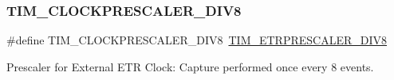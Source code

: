 \subsubsection{\texorpdfstring{TIM\_CLOCKPRESCALER\_DIV8}{TIM\_CLOCKPRESCALER\_DIV8}}
{\footnotesize\ttfamily \#define T\+I\+M\+\_\+\+C\+L\+O\+C\+K\+P\+R\+E\+S\+C\+A\+L\+E\+R\+\_\+\+D\+I\+V8~\mbox{\hyperlink{group___t_i_m___e_t_r___prescaler_ga834e38200874cced108379b17a24d0b7}{T\+I\+M\+\_\+\+E\+T\+R\+P\+R\+E\+S\+C\+A\+L\+E\+R\+\_\+\+D\+I\+V8}}}

Prescaler for External E\+TR Clock\+: Capture performed once every 8 events. 